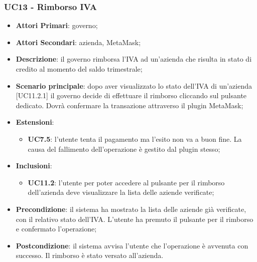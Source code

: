 \subsubsection{UC13 - Rimborso IVA}
\begin{itemize}
	\item \textbf{Attori Primari}:
	governo;
	\item \textbf{Attori Secondari}:
	azienda, MetaMask\glo;
	\item \textbf{Descrizione}: il governo rimborsa l'IVA ad un'azienda che risulta in stato di credito al momento del saldo trimestrale;
	\item \textbf{Scenario principale}: dopo aver visualizzato lo stato dell'IVA di un'azienda [UC11.2.1] il governo decide di effettuare il rimborso cliccando sul pulsante dedicato. Dovrà confermare la transazione attraverso il plugin MetaMask\glo;
	\item \textbf{Estensioni}: 
	\begin{itemize}
		\item \textbf{UC7.5}: l'utente tenta il pagamento ma l'esito non va a buon fine. La causa del fallimento dell'operazione è gestito dal plugin stesso;
	\end{itemize}
	\item \textbf{Inclusioni}: 
	\begin{itemize}
		\item \textbf{UC11.2}: l'utente per poter accedere al pulsante per il rimborso dell'azienda deve visualizzare la lista delle aziende verificate;
	\end{itemize}
	\item \textbf{Precondizione}: il sistema ha mostrato la lista delle aziende già verificate, con il relativo stato dell'IVA. L'utente ha premuto il pulsante per il rimborso e confermato l'operazione;
	\item \textbf{Postcondizione}: il sistema avvisa l'utente che l'operazione è avvenuta con successo. Il rimborso è stato versato all'azienda.
\end{itemize} 
